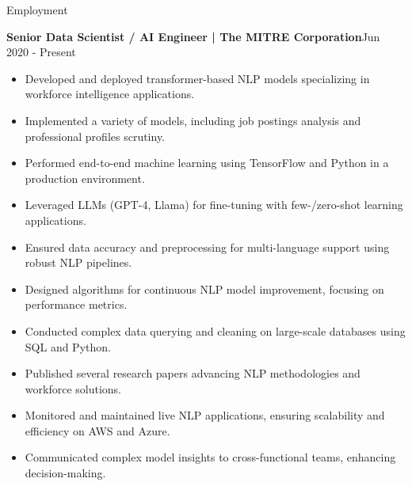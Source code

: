 \documentclass{resume} %
\begin{document}
\begin{rSection}{Employment}

\textbf{Senior Data Scientist / AI Engineer | The MITRE Corporation}\hfill Jun 2020 - Present
\begin{itemize}
    \item Developed and deployed transformer-based NLP models specializing in workforce intelligence applications.
    \item Implemented a variety of models, including job postings analysis and professional profiles scrutiny.
    \item Performed end-to-end machine learning using TensorFlow and Python in a production environment.
    \item Leveraged LLMs (GPT-4, Llama) for fine-tuning with few-/zero-shot learning applications.
    \item Ensured data accuracy and preprocessing for multi-language support using robust NLP pipelines.
    \item Designed algorithms for continuous NLP model improvement, focusing on performance metrics.
    \item Conducted complex data querying and cleaning on large-scale databases using SQL and Python.
    \item Published several research papers advancing NLP methodologies and workforce solutions.
    \item Monitored and maintained live NLP applications, ensuring scalability and efficiency on AWS and Azure.
    \item Communicated complex model insights to cross-functional teams, enhancing decision-making.
\end{itemize} 

\end{rSection}
\end{document}

